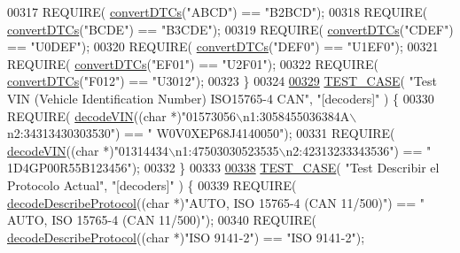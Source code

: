 \begin{DoxyCode}
{{{00317     REQUIRE( \hyperlink{decoders_8cpp_a4f18f411252f4c60fae4af320989c262}{convertDTCs}(\textcolor{stringliteral}{"ABCD"}) == \textcolor{stringliteral}{"B2BCD"});
00318     REQUIRE( \hyperlink{decoders_8cpp_a4f18f411252f4c60fae4af320989c262}{convertDTCs}(\textcolor{stringliteral}{"BCDE"}) == \textcolor{stringliteral}{"B3CDE"});
00319     REQUIRE( \hyperlink{decoders_8cpp_a4f18f411252f4c60fae4af320989c262}{convertDTCs}(\textcolor{stringliteral}{"CDEF"}) == \textcolor{stringliteral}{"U0DEF"});
00320     REQUIRE( \hyperlink{decoders_8cpp_a4f18f411252f4c60fae4af320989c262}{convertDTCs}(\textcolor{stringliteral}{"DEF0"}) == \textcolor{stringliteral}{"U1EF0"});
00321     REQUIRE( \hyperlink{decoders_8cpp_a4f18f411252f4c60fae4af320989c262}{convertDTCs}(\textcolor{stringliteral}{"EF01"}) == \textcolor{stringliteral}{"U2F01"});
00322     REQUIRE( \hyperlink{decoders_8cpp_a4f18f411252f4c60fae4af320989c262}{convertDTCs}(\textcolor{stringliteral}{"F012"}) == \textcolor{stringliteral}{"U3012"});
00323 \}
00324 
\hyperlink{UnitTestCase_8cpp_a3c8d23281675ad40ff5cd11d163c1213}{00329} \hyperlink{UnitTestCase_8cpp_ab1b7b485076e7de68cd9912827a8ee86}{TEST\_CASE}( \textcolor{stringliteral}{"Test VIN (Vehicle Identification Number) ISO15765-4 CAN"}, \textcolor{stringliteral}{"[decoders]"} ) \{
00330     REQUIRE( \hyperlink{decoders_8cpp_a66754738119854c13a74265e209083e4}{decodeVIN}((\textcolor{keywordtype}{char} *)\textcolor{stringliteral}{"01573056\(\backslash\)n1:3058455036384A\(\backslash\)n2:34313430303530"}) == \textcolor{stringliteral}{"
      W0V0XEP68J4140050"});
00331     REQUIRE( \hyperlink{decoders_8cpp_a66754738119854c13a74265e209083e4}{decodeVIN}((\textcolor{keywordtype}{char} *)\textcolor{stringliteral}{"01314434\(\backslash\)n1:47503030523535\(\backslash\)n2:42313233343536"}) == \textcolor{stringliteral}{"
      1D4GP00R55B123456"});
00332 \}
00333 
\hyperlink{UnitTestCase_8cpp_ada6898123ac1c26cdb74330eea16b825}{00338} \hyperlink{UnitTestCase_8cpp_ab1b7b485076e7de68cd9912827a8ee86}{TEST\_CASE}( \textcolor{stringliteral}{"Test Describir el Protocolo Actual"}, \textcolor{stringliteral}{"[decoders]"} ) \{
00339     REQUIRE( \hyperlink{decoders_8cpp_ab83ce79cd098ea655f3812488e304a0c}{decodeDescribeProtocol}((\textcolor{keywordtype}{char} *)\textcolor{stringliteral}{"AUTO, ISO 15765-4 (CAN 11/500)"}) == \textcolor{stringliteral}{"
      AUTO, ISO 15765-4 (CAN 11/500)"});
00340     REQUIRE( \hyperlink{decoders_8cpp_ab83ce79cd098ea655f3812488e304a0c}{decodeDescribeProtocol}((\textcolor{keywordtype}{char} *)\textcolor{stringliteral}{"ISO 9141-2"}) == \textcolor{stringliteral}{"ISO 9141-2"});
}}}
\end{DoxyCode}
